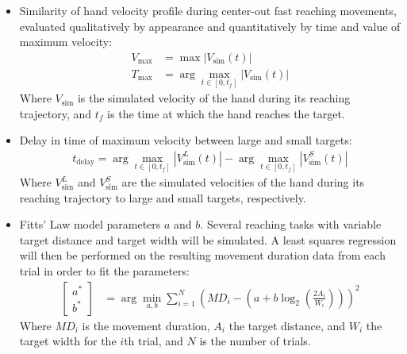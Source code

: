 \documentclass[letterpaper, 10pt, conference]{ieeeconf}
\begin{document}
\begin{itemize}
    \item Similarity of hand velocity profile during center-out fast reaching movements, evaluated qualitatively by appearance and quantitatively by time and value of maximum velocity:
    \begin{align}
        V_{\text{max}} &= \max \left|V_{\text{sim}}(t)\right| \\
        T_{\text{max}} &= \arg\max_{t \in [0, t_f]} \left|V_{\text{sim}}(t)\right|
    \end{align}
    Where $V_{\text{sim}}$ is the simulated velocity of the hand during its reaching trajectory, and $t_f$ is the time at which the hand reaches the target.

    \item Delay in time of maximum velocity between large and small targets:
    \begin{multline}
        t_{\text{delay}} = \arg\max_{t \in [0, t_f]} \left|V_{\text{sim}}^{L}(t)\right| - \arg\max_{t \in [0, t_f]} \left|V_{\text{sim}}^{S}(t)\right|
    \end{multline}
    Where $V_{\text{sim}}^{L}$ and $V_{\text{sim}}^{S}$ are the simulated velocities of the hand during its reaching trajectory to large and small targets, respectively.
    \item Fitts' Law model parameters $a$ and $b$.
    Several reaching tasks with variable target distance and target width will be simulated. A least squares regression will then be performed on the resulting movement duration data from each trial in order to fit the parameters:
    \begin{align}
        \begin{bmatrix}
            a^* \\ b^*
        \end{bmatrix} &= \arg\min_{a, b} \sum_{i=1}^N \left(MD_i - \left(a + b \log_2\left(\frac{2A_i}{W_i}\right)\right)\right)^2
    \end{align}
    Where $MD_i$ is the movement duration, $A_i$ the target distance, and $W_i$ the target width for the $i$th trial, and $N$ is the number of trials.
\end{itemize}
\end{document}
